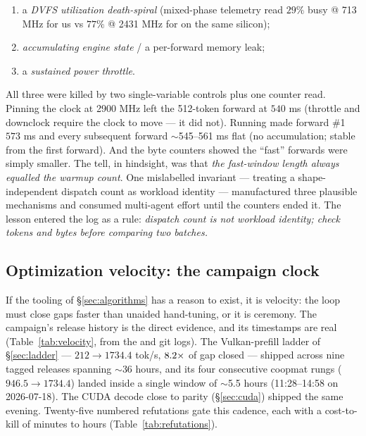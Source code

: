 \documentclass[11pt]{article}
\begin{document}
\begin{enumerate}[leftmargin=1.6em,itemsep=1pt,topsep=2pt]
\item a \emph{DVFS utilization death-spiral} (mixed-phase telemetry read $29\%$ busy @ 713 MHz for us vs
$77\%$ @ 2431 MHz for  on the same silicon);
\item \emph{accumulating engine state} / a per-forward memory leak;
\item a \emph{sustained power throttle}.
\end{enumerate}

All three were killed by two single-variable controls plus one counter read. Pinning the clock at 2900 MHz
left the 512-token forward at $540$ ms (throttle and downclock require the clock to move --- it did not).
Running  made forward \#1 $573$ ms and every subsequent forward $\sim$545--561 ms flat (no
accumulation; stable from the first forward). And the byte counters showed the ``fast'' forwards were
simply smaller. The tell, in hindsight, was that \emph{the fast-window length always equalled the warmup
count}. One mislabelled invariant --- treating a shape-independent dispatch count as workload identity ---
manufactured three plausible mechanisms and consumed multi-agent effort until the counters ended it. The
lesson entered the log as a rule: \emph{dispatch count is not workload identity; check tokens and bytes
before comparing two batches.}

\subsection{Optimization velocity: the campaign clock}
\label{sec:velocity}

If the tooling of \S\ref{sec:algorithms} has a reason to exist, it is velocity: the loop must close gaps
faster than unaided hand-tuning, or it is ceremony. The campaign's release history is the direct evidence,
and its timestamps are real (Table~\ref{tab:velocity}, from the  and  git logs). The
Vulkan-prefill ladder of \S\ref{sec:ladder} --- $212\to1734.4$ tok/s, $8.2\times$ of gap closed --- shipped
across nine tagged releases spanning $\sim$36 hours, and its four consecutive coopmat rungs
($946.5\to1734.4$) landed inside a single window of $\sim$5.5 hours (11:28--14:58 on 2026-07-18). The CUDA
decode close to parity (\S\ref{sec:cuda}) shipped the same evening. Twenty-five numbered refutations gate
this cadence, each with a cost-to-kill of minutes to hours (Table~\ref{tab:refutations}).
\end{document}
